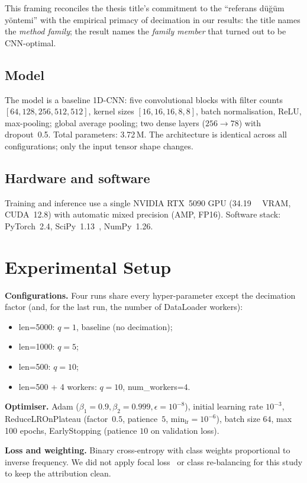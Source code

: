 \documentclass[conference]{IEEEtran}
\begin{document}
This framing reconciles the thesis title's commitment to the
``referans düğüm yöntemi'' with the empirical primacy of decimation in
our results: the title names the \emph{method family}; the result names
the \emph{family member} that turned out to be CNN-optimal.

\subsection{Model}
The model is a baseline 1D-CNN: five convolutional blocks with filter
counts $[64,128,256,512,512]$, kernel sizes $[16,16,16,8,8]$, batch
normalisation, ReLU, max-pooling; global average pooling; two dense
layers ($256\!\rightarrow\!\num{78}$) with dropout~\num{0.5}. Total
parameters: \num{3.72}\,M.
The architecture is identical across all configurations; only the input
tensor shape changes.

\subsection{Hardware and software}
Training and inference use a single NVIDIA RTX~5090 GPU
(\SI{34.19}{\gibi\byte} VRAM, CUDA~12.8) with automatic mixed precision
(AMP, FP16). Software stack: PyTorch~2.4, SciPy~1.13~\cite{scipy2020},
NumPy~1.26.

\section{Experimental Setup}
\label{sec:experimental}
\textbf{Configurations.} Four runs share every hyper-parameter except the
decimation factor (and, for the last run, the number of DataLoader
workers):
\begin{itemize}
  \item len=\num{5000}: $q=1$, baseline (no decimation);
  \item len=\num{1000}: $q=5$;
  \item len=\num{500}: $q=10$;
  \item len=\num{500} + 4 workers: $q=10$, num\_workers=$4$.
\end{itemize}
\textbf{Optimiser.} Adam ($\beta_1=0.9, \beta_2=0.999, \epsilon=10^{-8}$),
initial learning rate $10^{-3}$, ReduceLROnPlateau (factor~$0.5$,
patience~$5$, min$_{\text{lr}}=10^{-6}$), batch size $64$, max
\num{100} epochs, EarlyStopping (patience $10$ on validation loss).

\textbf{Loss and weighting.} Binary cross-entropy with class weights
proportional to inverse frequency. We did not apply focal
loss~\cite{lin2017} or class re-balancing for this study to keep the
attribution clean.
\end{document}
